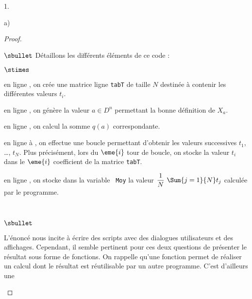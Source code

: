 \begin{noliste}{1.}
\begin{noliste}{a)}
\begin{proof}
\begin{noliste}{$\sbullet$}
        \noindent
        Détaillons les différents éléments de ce code :
        \begin{noliste}{$\stimes$}
        \item en ligne , on crée une matrice ligne {\tt tabT}
          de taille $N$ destinée à contenir les différentes valeurs
          $t_i$.
        \item en ligne , on génère la valeur $a \in D^n$
          permettant la bonne définition de $X_a$.
        \item en ligne , on calcul la somme $q(a)$
          correspondante.
        \item en ligne  à , on effectue une boucle
          permettant d'obtenir les valeurs successives $t_1$, \ldots,
          $t_N$. Plus précisément, lors du $\eme{i}$ tour de boucle,
          on stocke la valeur $t_i$ dans le $\eme{i}$ coefficient de
          la matrice {\tt tabT}.
        \item en ligne , on stocke dans la variable {\tt
            Moy} la valeur $\dfrac{1}{N} \ \Sum{j=1}{N} t_j$ calculée
          par le programme. 
        \end{noliste}
      \end{noliste}~\\[-.8cm]
      \begin{remarkL}{.98}%
        \begin{noliste}{$\sbullet$}
        \item L'énoncé nous incite à écrire des scripts avec des
          dialogues utilisateurs et des affichages. Cependant, il
          semble pertinent pour ces deux questions de présenter le
          résultat sous forme de fonctions. On rappelle qu'une
          fonction permet de réaliser un calcul dont le résultat est
          réutilisable par un autre programme. C'est d'ailleurs une

\end{noliste}
\end{remarkL}
\end{proof}
\end{noliste}
\end{noliste}
